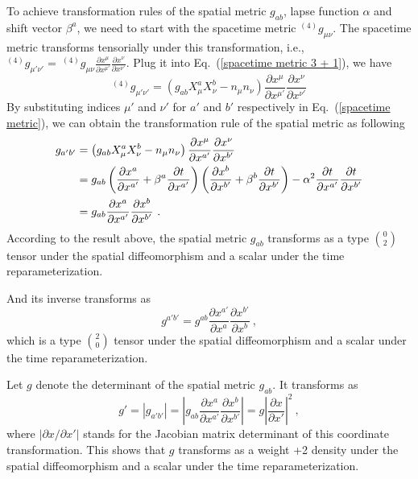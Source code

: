 To achieve transformation rules of the spatial metric $g_{ab}$, lapse function $\alpha$ and shift vector $\beta^{a}$, we need to start with the spacetime metric $^{(4)}g_{\mu\nu}$. The spacetime metric transforms tensorially under this transformation, i.e., $^{(4)}g_{\mu' \nu'} =~^{(4)}g_{\mu\nu}\frac{\partial x^{\mu}}{\partial x^{\mu'}}\frac{\partial x^{\nu}}{\partial x^{\nu'}}$. Plug it into Eq.~(\ref{spacetime metric 3 + 1}), we have
\begin{equation}\label{spacetime metric}
^{\left(4\right)}g_{\mu'\nu'} = \left(g_{ab}X^{a}_{\mu}X^{b}_{\nu} - n_{\mu}n_{\nu}\right)\frac{\partial x^{\mu}}{\partial x^{\mu'}}\frac{\partial x^{\nu}}{\partial x^{\nu'}}
\end{equation}
By substituting indices $\mu'$ and $\nu'$ for $a'$ and $b'$ respectively in Eq.~(\ref{spacetime metric}), we can obtain the transformation rule of the spatial metric as following
\begin{align}\label{spatialmetric}
g_{a'b'} & = \left(g_{ab}X^{a}_{\mu}X^{b}_{\nu} - n_{\mu}n_{\nu}\right)\frac{\partial x^{\mu}}{\partial x^{a'}}\frac{\partial x^{\nu}}{\partial x^{b'}}\notag\\
&= g_{ab}\left(\frac{\partial x^{a}}{\partial x^{a'}} + \beta^{a}\frac{\partial t}{\partial x^{a'}}\right)\left(\frac{\partial x^{b}}{\partial x^{b'}} + \beta^{b}\frac{\partial t}{\partial x^{b'}}\right) - \alpha^2\frac{\partial t}{\partial x^{a'}}\frac{\partial t}{\partial x^{b'}}\notag\\
& = g_{ab}\frac{\partial x^{a}}{\partial x^{a'}}\frac{\partial x^{b}}{\partial x^{b'}} \ .
\end{align}
According to the result above, the spatial metric $g_{ab}$ transforms as a type $0 \choose 2$ tensor under the spatial diffeomorphism and a scalar under the time reparameterization.

And its inverse transforms as
\begin{equation}\label{spatialmetricinverse}
g^{a'b'} = g^{ab}\frac{\partial x^{a'}}{\partial x^{a}}\frac{\partial x^{b'}}{\partial x^{b}} \ , 
\end{equation}
which is a type $2 \choose 0$ tensor under the spatial diffeomorphism and a scalar under the time reparameterization. 

Let $g$ denote the determinant of the spatial metric $g_{ab}$. It transforms as
\begin{equation}\label{spatialmetricdet}
g' = \left|g_{a'b'}\right| = \left|g_{ab}\frac{\partial x^{a}}{\partial x^{a'}}\frac{\partial x^{b}}{\partial x^{b'}}\right|  = g\left|\frac{\partial x}{\partial x'}\right|^{2} \ ,
\end{equation}
where $\left|\partial x/\partial x'\right|$ stands for the Jacobian matrix determinant of this coordinate transformation. This shows that $g$ transforms as a weight +2 density under the spatial diffeomorphism and a scalar under the time reparameterization. 

